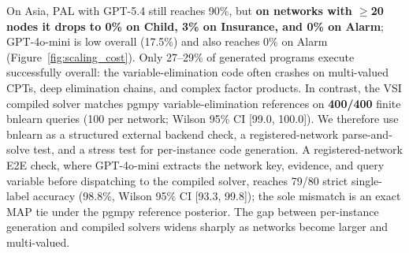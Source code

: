 \documentclass{article}
\begin{document}
On Asia, PAL with GPT-5.4 still reaches 90\%, but \textbf{on networks with $\geq$20 nodes it drops to 0\% on Child, 3\% on Insurance, and 0\% on Alarm}; GPT-4o-mini is low overall (17.5\%) and also reaches 0\% on Alarm (Figure~\ref{fig:scaling_cost}).
Only 27--29\% of generated programs execute successfully overall: the variable-elimination code often crashes on multi-valued CPTs, deep elimination chains, and complex factor products.
In contrast, the VSI compiled solver matches pgmpy variable-elimination references on \textbf{400/400} finite bnlearn queries (100 per network; Wilson 95\% CI [99.0, 100.0]).
We therefore use bnlearn as a structured external backend check, a registered-network parse-and-solve test, and a stress test for per-instance code generation.
A registered-network E2E check, where GPT-4o-mini extracts the network key, evidence, and query variable before dispatching to the compiled solver, reaches 79/80 strict single-label accuracy (98.8\%, Wilson 95\% CI [93.3, 99.8]); the sole mismatch is an exact MAP tie under the pgmpy reference posterior.
The gap between per-instance generation and compiled solvers widens sharply as networks become larger and multi-valued.
\end{document}

